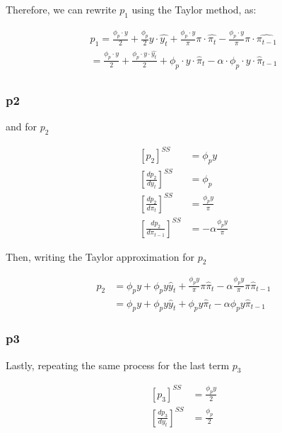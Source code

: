 \documentclass[11pt,preprint, authoryear]{elsarticle}
\numberwithin{equation}{section}
\numberwithin{figure}{section}
\numberwithin{table}{section}
\begin{document}
Therefore, we can rewrite \(p_{1}\) using the Taylor method, as:

\[\begin{aligned}
p_{1} = \frac{\phi_{p} \cdot y}{2} + \frac{\phi_{p}}{2} y \cdot \hat{y_{t}} + \frac{\phi_{p} \cdot y}{\pi} \pi \cdot \hat{\pi_{t}} - \frac{\phi_{p} \cdot y}{\pi}\pi \cdot \hat{\pi_{t-1}}\\
= \frac{\phi_{p} \cdot y}{2} + \frac{\phi_{p} \cdot y \cdot \hat{y_{t}} }{2} + \phi_{p} \cdot y \cdot \hat{\pi}_{t} - \alpha \cdot \phi_{p} \cdot y \cdot \hat{\pi}_{t-1} \\
\end{aligned}\]

\hypertarget{p2}{%
\subsubsection{p2}\label{p2}}

and for \(p_{2}\)

\[\begin{aligned}
\left[ p_{2} \right]^{SS} &= \phi_{p} y
\\
\left[ \frac{dp_{2}}{dy_{t}} \right]^{SS} &= \phi_{p}
\\
\left[ \frac{dp_{2}}{d\pi_{t}} \right]^{SS} &= \frac{\phi_{p} y}{\pi}
\\
\left[ \frac{dp_{2}}{d\pi_{t-1}} \right]^{SS} &= - \alpha \frac{\phi_{p} y}{\pi}
\end{aligned}\]

Then, writing the Taylor approximation for \(p_{2}\)

\[\begin{aligned}
p_{2} &= \phi_{p} y + \phi_{p} y \hat{y}_{t} + \frac{\phi_{p} y}{\pi} \pi \hat{\pi}_{t} - \alpha \frac{\phi_{p} y}{\pi} \pi \hat{\pi}_{t-1}\\
&= \phi_{p} y + \phi_{p} y \hat{y}_{t} + \phi_{p} y \hat{\pi}_{t} - \alpha \phi_{p} y \hat{\pi}_{t-1}
\end{aligned}\]

\hypertarget{p3}{%
\subsubsection{p3}\label{p3}}

Lastly, repeating the same process for the last term \(p_{3}\)

\[\begin{aligned}
\left[ p_{3} \right]^{SS} &= \frac{\phi_{p} y} {2}\\\left[ \frac{dp_{3}}{dy_{t}} \right]^{SS} &= \frac{\phi_{p}}{2}
\end{aligned}\]
\end{document}
